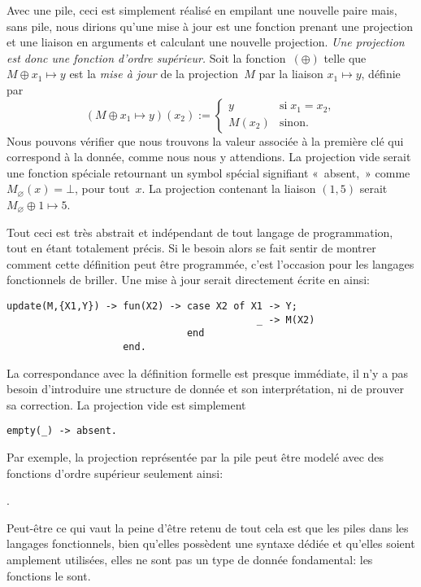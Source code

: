 Avec une pile, ceci est simplement réalisé en empilant une nouvelle
paire mais, sans pile, nous dirions qu'une mise à jour est une
fonction prenant une projection et une liaison en arguments et
calculant une nouvelle projection. \emph{Une projection est donc une
fonction d'ordre supérieur.} Soit la fonction~\((\oplus)\) telle que
\(M \mathrel{\oplus} x_1 \mapsto y\) est la \emph{mise à jour} de la
projection~\(M\) par la liaison \(x_1 \mapsto y\), définie par
\begin{equation*}
(M \mathrel{\oplus} x_1 \mapsto y)(x_2) :=
\begin{cases}
  y      & \text{si} \; x_1 = x_2,\\
  M(x_2) & \text{sinon.}
\end{cases}
\end{equation*}
Nous pouvons vérifier que nous trouvons la valeur associée à la
première clé qui correspond à la donnée, comme nous nous y
attendions. La projection vide serait une fonction spéciale retournant
un symbol spécial signifiant «~absent,~» comme \(M_\varnothing(x) =
\bot\), pour tout~\(x\). La projection contenant la liaison \((1,5)\)
serait \(M_\varnothing \mathrel{\oplus} 1 \mapsto 5\).

Tout ceci est très abstrait et indépendant de tout langage de
programmation, tout en étant totalement précis. Si le besoin alors se
fait sentir de montrer comment cette définition peut être programmée,
c'est l'occasion pour les langages fonctionnels de briller. Une mise à
jour serait directement écrite en \Erlang ainsi:
\begin{verbatim}
update(M,{X1,Y}) -> fun(X2) -> case X2 of X1 -> Y;
                                           _ -> M(X2)
                               end
                    end.
\end{verbatim}
La correspondance avec la définition formelle est presque immédiate,
il n'y a pas besoin d'introduire une structure de donnée et son
interprétation, ni de prouver sa correction. La projection vide est
simplement
\begin{verbatim}
empty(_) -> absent.
\end{verbatim}
Par exemple, la projection représentée par la pile
\erlcode{[\{a,0\},\{b,1\},\{a,5\}]} peut être modelé avec des
fonctions d'ordre supérieur seulement ainsi:
\begin{center}
.
\end{center}
Peut-être ce qui vaut la peine d'être retenu de tout cela est que les
piles dans les langages fonctionnels, bien qu'elles possèdent une
syntaxe dédiée et qu'elles soient amplement utilisées, elles ne sont
pas un type de donnée fondamental: les fonctions le sont.

